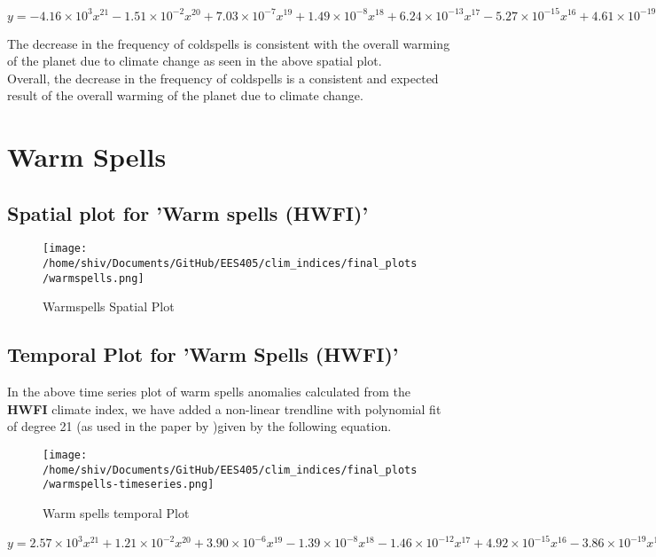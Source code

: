 \documentclass[a4paper, 12pt, twoside]{report}
\begin{document}
$ y = -4.16\times10^{3}x^{21}-1.51\times10^{-2}x^{20}+7.03\times10^{-7}x^{19}+1.49\times10^{-8}x^{18}+6.24\times10^{-13}x^{17}-5.27\times10^{-15}x^{16}+4.61\times10^{-19}x^{15}+7.93\times10^{-22}x^{14}-1.99\times10^{-25}x^{13}-3.21\times10^{-29}x^{12}+2.05\times10^{-32}x^{11}-2.66\times10^{-36}x^{10}-2.89\times10^{-40}x^{9}+1.54\times10^{-43}x^{8}-2.71\times10^{-47}x^{7}+2.89\times10^{-51}x^{6}-2.09\times10^{-55}x^{5}+1.05\times10^{-59}x^{4}-3.65\times10^{-64}x^{3}+8.39\times10^{-69}x^{2}-1.15\times10^{-73}x+7.12\times10^{-79}$

The decrease in the frequency of coldspells is consistent with the overall warming of the planet due to climate change as seen in the above spatial plot.\\
Overall, the decrease in the frequency of coldspells is a consistent and expected result of the overall warming of the planet due to climate change.

\section{Warm Spells}
\subsection{Spatial plot for 'Warm spells (HWFI)'}
\begin{figure}[htb]
    \centering
    \texttt{[image: /home/shiv/Documents/GitHub/EES405/clim\_indices/final\_plots/warmspells.png]}
    \caption{Warmspells Spatial Plot}
    \label{fig:warm_spells_spatial}
\end{figure}

\subsection{Temporal Plot for 'Warm Spells (HWFI)'}
In the above time series plot of warm spells anomalies calculated from the \textbf{HWFI} climate index, we have added a non-linear trendline with polynomial fit of degree 21 (as used in the paper by )given by the following equation. \\
\begin{figure}[htb]
    \centering
    \texttt{[image: /home/shiv/Documents/GitHub/EES405/clim\_indices/final\_plots/warmspells-timeseries.png]}
    \caption{Warm spells temporal Plot}
    \label{fig:warmspells_temporal}
\end{figure}

$ y = 2.57\times10^{3}x^{21}+1.21\times10^{-2}x^{20}+3.90\times10^{-6}x^{19}-1.39\times10^{-8}x^{18}-1.46\times10^{-12}x^{17}+4.92\times10^{-15}x^{16}-3.86\times10^{-19}x^{15}-7.24\times10^{-22}x^{14}+1.83\times10^{-25}x^{13}+2.79\times10^{-29}x^{12}-1.85\times10^{-32}x^{11}+2.48\times10^{-36}x^{10}+2.42\times10^{-40}x^{9}-1.38\times10^{-43}x^{8}+2.47\times10^{-47}x^{7}-2.66\times10^{-51}x^{6}+1.94\times10^{-55}x^{5}-9.87\times10^{-60}x^{4}+3.46\times10^{-64}x^{3}-8.01\times10^{-69}x^{2}+1.11\times10^{-73}x-6.91\times10^{-79}$
\end{document}
